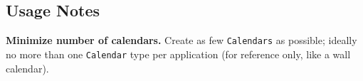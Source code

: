 
\subsection{Usage Notes}

{\bf Minimize number of calendars.}  Create as few {\tt Calendars} as possible; 
ideally no more than one {\tt Calendar} type per application (for reference only, 
like a wall calendar).  
